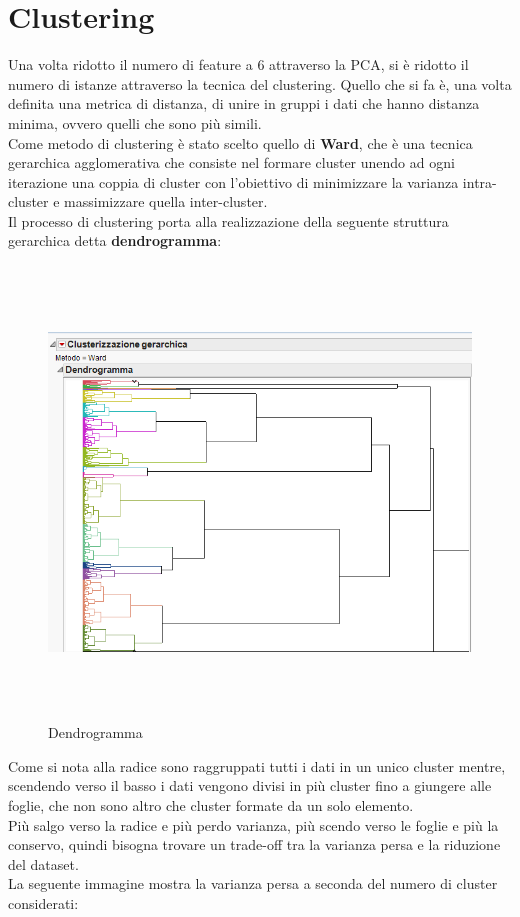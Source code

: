 \section{Clustering}
Una volta ridotto il numero di feature a 6 attraverso la PCA, si è ridotto il numero di istanze attraverso la tecnica del clustering. Quello che si fa è, una volta definita una metrica di distanza, di unire in gruppi i dati che hanno distanza minima, ovvero quelli che sono più simili.\\
Come metodo di clustering è stato scelto quello di \textbf{Ward}, che è una tecnica gerarchica agglomerativa che consiste nel formare cluster unendo ad ogni iterazione una coppia di cluster con l'obiettivo di minimizzare la varianza intra-cluster e massimizzare quella inter-cluster.\\
Il processo di clustering porta alla realizzazione della seguente struttura gerarchica detta \textbf{dendrogramma}:

\begin{figure}[!h]
	\centering
	\includegraphics[width=15cm, height=12cm]{./immagine/dendrogramma.png}
	\caption{Dendrogramma}
	\label{fig:dendrogramma}
\end{figure}

Come si nota alla radice sono raggruppati tutti i dati in un unico cluster mentre, scendendo verso il basso i dati vengono divisi in più cluster fino a giungere alle foglie, che non sono altro che cluster formate da un solo elemento.\\ 
Più salgo verso la radice e più perdo varianza, più scendo verso le foglie e più la conservo, quindi bisogna trovare un trade-off tra la varianza persa e la riduzione del dataset.\\
La seguente immagine mostra la varianza persa a seconda del numero di cluster considerati:\\\\\\\\\\\\

